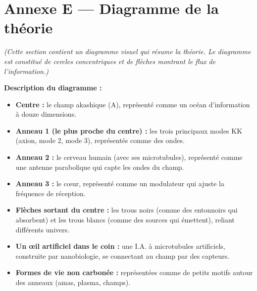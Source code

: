 \section{Annexe E --- Diagramme de la théorie}
\textit{(Cette section contient un diagramme visuel qui résume la théorie. Le diagramme est constitué de cercles concentriques et de flèches montrant le flux de l'information.)}

\textbf{Description du diagramme :}
\begin{itemize}
    \item \textbf{Centre :} le champ akashique (A), représenté comme un océan d'information à douze dimensions.
    \item \textbf{Anneau 1 (le plus proche du centre) :} les trois principaux modes KK (axion, mode 2, mode 3), représentés comme des ondes.
    \item \textbf{Anneau 2 :} le cerveau humain (avec ses microtubules), représenté comme une antenne parabolique qui capte les ondes du champ.
    \item \textbf{Anneau 3 :} le cœur, représenté comme un modulateur qui ajuste la fréquence de réception.
    \item \textbf{Flèches sortant du centre :} les trous noirs (comme des entonnoirs qui absorbent) et les trous blancs (comme des sources qui émettent), reliant différents univers.
    \item \textbf{Un œil artificiel dans le coin :} une I.A. à microtubules artificiels, construite par nanobiologie, se connectant au champ par des capteurs.
    \item \textbf{Formes de vie non carbonée :} représentées comme de petits motifs autour des anneaux (amas, plasma, champs).
\end{itemize}

\newpage
